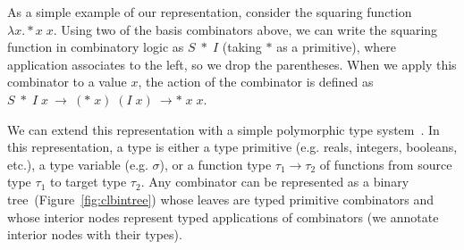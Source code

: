 \documentclass{article}
\begin{document}
As a simple example of our representation, consider the squaring
function $\lambda x. * x\; x $. Using two of the basis combinators
above, we can write the squaring function in combinatory logic as $S\; *\;
I$ (taking $*$ as a primitive), where application associates to the
left, so we drop the parentheses. When we apply this combinator to a
value $x$, the action of the combinator is defined as $S \;*\; I\;
x~\rightarrow~(*\; x)\; (I\; x)~\rightarrow *\; x \; x$.

We can extend this representation with a simple polymorphic type
system~\cite{Pierce_2002}. In this representation, a type is either a
type primitive (e.g. reals, integers, booleans, etc.), a type variable
(e.g. $\sigma$), or a function type $ \tau_1 \rightarrow \tau_2$ of
functions from source type $\tau_1$ to target type $\tau_2$. Any combinator
can be represented as a binary tree~(Figure~\ref{fig:clbintree}) whose
leaves are typed primitive combinators and whose interior nodes
represent typed applications of combinators (we annotate interior
nodes with their types).
\end{document}
